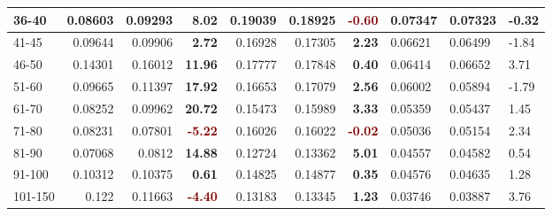 \begin{table}[]
\begin{tabular}{|l|r|r|r||r|r|r||l|l|l|}
        36-40     & 0.08603                                 & 0.09293                       & \textbf{\textcolor{OliveGreen}{8.02}}  & 0.19039                    & 0.18925                  & \textbf{\textcolor{Maroon}{-0.60}}    & 0.07347 & 0.07323     & -0.32 \\ \hline
        41-45     & 0.09644                                 & 0.09906                       & \textbf{\textcolor{OliveGreen}{2.72}}  & 0.16928                    & 0.17305                  & \textbf{\textcolor{OliveGreen}{2.23}} & 0.06621 & 0.06499     & -1.84 \\ \hline
        46-50     & 0.14301                                 & 0.16012                       & \textbf{\textcolor{OliveGreen}{11.96}} & 0.17777                    & 0.17848                  & \textbf{\textcolor{OliveGreen}{0.40}} & 0.06414 & 0.06652     & 3.71  \\ \hline
        51-60     & 0.09665                                 & 0.11397                       & \textbf{\textcolor{OliveGreen}{17.92}} & 0.16653                    & 0.17079                  & \textbf{\textcolor{OliveGreen}{2.56}} & 0.06002 & 0.05894     & -1.79 \\ \hline
        61-70     & 0.08252                                 & 0.09962                       & \textbf{\textcolor{OliveGreen}{20.72}} & 0.15473                    & 0.15989                  & \textbf{\textcolor{OliveGreen}{3.33}} & 0.05359 & 0.05437     & 1.45  \\ \hline
        71-80     & 0.08231                                 & 0.07801                       & \textbf{\textcolor{Maroon}{-5.22}}     & 0.16026                    & 0.16022                  & \textbf{\textcolor{Maroon}{-0.02}}    & 0.05036 & 0.05154     & 2.34  \\ \hline
        81-90     & 0.07068                                 & 0.0812                        & \textbf{\textcolor{OliveGreen}{14.88}} & 0.12724                    & 0.13362                  & \textbf{\textcolor{OliveGreen}{5.01}} & 0.04557 & 0.04582     & 0.54  \\ \hline
        91-100    & 0.10312                                 & 0.10375                       & \textbf{\textcolor{OliveGreen}{0.61}}  & 0.14825                    & 0.14877                  & \textbf{\textcolor{OliveGreen}{0.35}} & 0.04576 & 0.04635     & 1.28  \\ \hline
        101-150   & 0.122                                   & 0.11663                       & \textbf{\textcolor{Maroon}{-4.40}}     & 0.13183                    & 0.13345                  & \textbf{\textcolor{OliveGreen}{1.23}} & 0.03746 & 0.03887     & 3.76  \\ \hline

\end{tabular}
\end{table}
